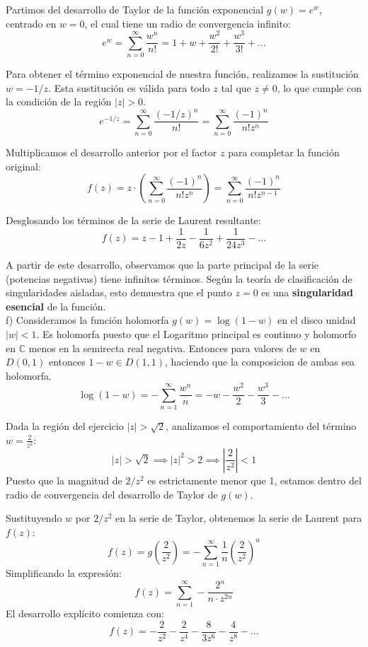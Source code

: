 {Partimos del desarrollo de Taylor de la función exponencial $g(w) = e^w$, centrado en $w=0$, el cual tiene un radio de convergencia infinito:
\begin{equation}
e^w = \sum_{n=0}^{\infty} \frac{w^n}{n!} = 1 + w + \frac{w^2}{2!} + \frac{w^3}{3!} + \dots
\end{equation}


Para obtener el término exponencial de nuestra función, realizamos la sustitución $w = -1/z$. Esta sustitución es válida para todo $z$ tal que $z \neq 0$, lo que cumple con la condición de la región $|z| > 0$.
\[ e^{-1/z} = \sum_{n=0}^{\infty} \frac{(-1/z)^n}{n!} = \sum_{n=0}^{\infty} \frac{(-1)^n}{n! z^n} \]


Multiplicamos el desarrollo anterior por el factor $z$ para completar la función original:
\[ f(z) = z \cdot \left( \sum_{n=0}^{\infty} \frac{(-1)^n}{n! z^n} \right) = \sum_{n=0}^{\infty} \frac{(-1)^n}{n! z^{n-1}} \]

Desglosando los términos de la serie de Laurent resultante:
\[ f(z) = z - 1 + \frac{1}{2z} - \frac{1}{6z^2} + \frac{1}{24z^3} - \dots \]

A partir de este desarrollo, observamos que la parte principal de la serie (potencias negativas) tiene infinitos términos. Según la teoría de clasificación de singularidades aisladas, esto demuestra que el punto $z=0$ es una \textbf{singularidad esencial} de la función.
\\
f)
Consideramos la función holomorfa $g(w) = \log(1-w)$ en el disco unidad $|w| < 1$. Es holomorfa puesto que el Logaritmo principal es continuo y holomorfo en $\mathbb{C}$ menos en la semirecta real negativa. Entonces para valores de $w$ en $D(0,1)$ entonces $1-w \in D(1,1)$, haciendo que la composicion de ambas sea holomorfa. 
\begin{equation}
\log(1-w) = -\sum_{n=1}^{\infty} \frac{w^n}{n} = -w - \frac{w^2}{2} - \frac{w^3}{3} - \dots
\end{equation}

Dada la región del ejercicio $|z| > \sqrt{2}$, analizamos el comportamiento del término $w = \frac{2}{z^2}$:
\[ |z| > \sqrt{2} \implies |z|^2 > 2 \implies \left| \frac{2}{z^2} \right| < 1 \]
Puesto que la magnitud de $2/z^2$ es estrictamente menor que 1, estamos dentro del radio de convergencia del desarrollo de Taylor de $g(w)$.


Sustituyendo $w$ por $2/z^2$ en la serie de Taylor, obtenemos la serie de Laurent para $f(z)$:
\[ f(z) = g\left(\frac{2}{z^2}\right) = -\sum_{n=1}^{\infty} \frac{1}{n} \left( \frac{2}{z^2} \right)^n \]
Simplificando la expresión:
\[ f(z) = \sum_{n=1}^{\infty} -\frac{2^n}{n \cdot z^{2n}} \]
El desarrollo explícito comienza con:
\[ f(z) = -\frac{2}{z^2} - \frac{2}{z^4} - \frac{8}{3z^6} - \frac{4}{z^8} - \dots \]
}